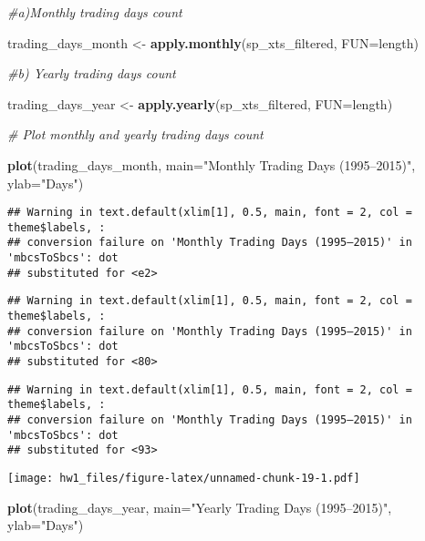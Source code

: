 \documentclass[
]{article}
\newenvironment{Shaded}{\begin{snugshade}}{\end{snugshade}}
\newcommand{\AttributeTok}[1]{\textcolor[rgb]{0.13,0.29,0.53}{#1}}
\newcommand{\CommentTok}[1]{\textcolor[rgb]{0.56,0.35,0.01}{\textit{#1}}}
\newcommand{\FunctionTok}[1]{\textcolor[rgb]{0.13,0.29,0.53}{\textbf{#1}}}
\newcommand{\NormalTok}[1]{#1}
\newcommand{\OtherTok}[1]{\textcolor[rgb]{0.56,0.35,0.01}{#1}}
\newcommand{\StringTok}[1]{\textcolor[rgb]{0.31,0.60,0.02}{#1}}
\begin{document}
\begin{Shaded}
\begin{Highlighting}[]
\CommentTok{\#a)Monthly trading days count}

\NormalTok{trading\_days\_month }\OtherTok{\textless{}{-}} \FunctionTok{apply.monthly}\NormalTok{(sp\_xts\_filtered, }\AttributeTok{FUN=}\NormalTok{length)}

\CommentTok{\#b) Yearly trading days count}

\NormalTok{trading\_days\_year }\OtherTok{\textless{}{-}} \FunctionTok{apply.yearly}\NormalTok{(sp\_xts\_filtered, }\AttributeTok{FUN=}\NormalTok{length)}

\CommentTok{\# Plot monthly and yearly trading days count}

\FunctionTok{plot}\NormalTok{(trading\_days\_month, }\AttributeTok{main=}\StringTok{"Monthly Trading Days (1995–2015)"}\NormalTok{, }\AttributeTok{ylab=}\StringTok{"Days"}\NormalTok{)}
\end{Highlighting}
\end{Shaded}

\begin{verbatim}
## Warning in text.default(xlim[1], 0.5, main, font = 2, col = theme$labels, :
## conversion failure on 'Monthly Trading Days (1995–2015)' in 'mbcsToSbcs': dot
## substituted for <e2>
\end{verbatim}

\begin{verbatim}
## Warning in text.default(xlim[1], 0.5, main, font = 2, col = theme$labels, :
## conversion failure on 'Monthly Trading Days (1995–2015)' in 'mbcsToSbcs': dot
## substituted for <80>
\end{verbatim}

\begin{verbatim}
## Warning in text.default(xlim[1], 0.5, main, font = 2, col = theme$labels, :
## conversion failure on 'Monthly Trading Days (1995–2015)' in 'mbcsToSbcs': dot
## substituted for <93>
\end{verbatim}

\texttt{[image: hw1\_files/figure-latex/unnamed-chunk-19-1.pdf]}

\begin{Shaded}
\begin{Highlighting}[]
\FunctionTok{plot}\NormalTok{(trading\_days\_year, }\AttributeTok{main=}\StringTok{"Yearly Trading Days (1995–2015)"}\NormalTok{, }\AttributeTok{ylab=}\StringTok{"Days"}\NormalTok{)}
\end{Highlighting}
\end{Shaded}
\end{document}
